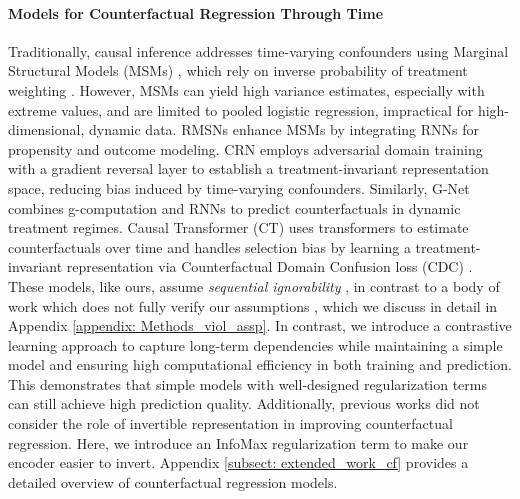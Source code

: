 \documentclass{article}
\theoremstyle{plain}
\theoremstyle{definition}
\theoremstyle{remark}
\begin{document}
\paragraph{Models for Counterfactual Regression Through Time} Traditionally, causal inference addresses time-varying confounders using Marginal Structural Models (MSMs) \citep{robins2000MSM}, which rely on inverse probability of treatment weighting \citep{robins-time-varying-exposures}. However, MSMs can yield high variance estimates, especially with extreme values, and are limited to pooled logistic regression, impractical for high-dimensional, dynamic data. RMSNs \citep{lim2018RMSM} enhance MSMs by integrating RNNs for propensity and outcome modeling. CRN \citep{bica2020estimatingCRN} employs adversarial domain training with a gradient reversal layer \citep{ganin2015unsupervised} to establish a treatment-invariant representation space, reducing bias induced by time-varying confounders. Similarly, G-Net \citep{Li2021GNetAR} combines g-computation and RNNs to predict counterfactuals in dynamic treatment regimes. Causal Transformer (CT) \citep{Melnychuk2022CausalTF} uses transformers to estimate counterfactuals over time and handles selection bias by learning a treatment-invariant representation via Counterfactual Domain Confusion loss (CDC) \citep{tzeng2015simultaneous}. These models, like ours, assume \emph{sequential ignorability} \cite{robins-time-varying-exposures}, in contrast to a body of work which does not fully verify our assumptions \citep{lopezmultipletreatments, Soleimani2017TreatmentResponseMF, schulam2017reliable, ranganath2018multiple, wang2019blessings,veitch2020adapting, Bica2020TimeSDecounf, hatt2021sequential, LuChengCMAproxynConf20121, kuzmanovic2021deconfounding,qian2021synctwin, seedat2022continuous, de2022predicting, cao2023estimating, hizli2023causal, JiangCF-GODE2023, berrevoets2021disentangled, chen2023multi, wu2023counterfactual, frauen2023estimating}, which we discuss in detail in Appendix \ref{appendix: Methods_viol_assp}. In contrast, we introduce a contrastive learning approach to capture long-term dependencies while maintaining a simple model and ensuring high computational efficiency in both training and prediction. This demonstrates that simple models with well-designed regularization terms can still achieve high prediction quality. Additionally, previous works \citep{robins-time-varying-exposures, robins2000MSM, lim2018RMSM, Li2021GNetAR, Melnychuk2022CausalTF} did not consider the role of invertible representation in improving counterfactual regression. Here, we introduce an InfoMax regularization term to make our encoder easier to invert. Appendix \ref{subsect: extended_work_cf} provides a detailed overview of counterfactual regression models.
\end{document}

